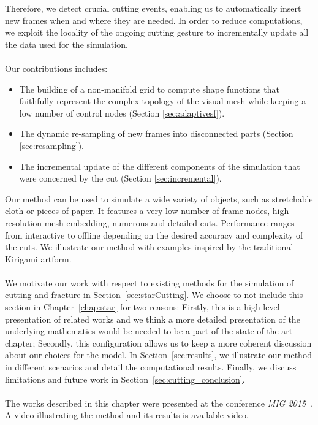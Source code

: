 Therefore, we detect crucial cutting events, enabling us to automatically insert new frames when and where they are needed.
In order to reduce computations, we exploit the locality of the ongoing cutting gesture to incrementally update all the data used for the simulation.
\\ \\
Our contributions includes:
\begin{itemize}
\item The building of a non-manifold grid to compute shape functions that faithfully represent the complex topology of the visual mesh while keeping a low number of control nodes (Section \ref{sec:adaptivesf}).
\item The dynamic re-sampling of new frames into disconnected parts (Section \ref{sec:resampling}).
\item The incremental update of the different components of the simulation that were concerned by the cut (Section \ref{sec:incremental}).
\end{itemize}

Our method can be used to simulate a wide variety of objects, such as stretchable cloth or pieces of paper. 
It features a very low number of frame nodes, high resolution mesh embedding, numerous and detailed cuts. 
Performance ranges from interactive to offline depending on the desired accuracy and complexity of the cuts.
We illustrate our method with examples inspired by the traditional Kirigami artform.
\\ \\
We motivate our work with respect to existing methods for the simulation of cutting and fracture in Section~\ref{sec:starCutting}.
We choose to not include this section in Chapter~\ref{chap:star} for two reasons:
Firstly, this is a high level presentation of related works and we think a more detailed presentation of the underlying mathematics would be needed to be a part of the state of the art chapter;
Secondly, this configuration allows us to keep a more coherent discussion about our choices for the model.
In Section~\ref{sec:results}, we illustrate our method in different scenarios and detail the computational results. 
Finally, we discuss limitations and future work in Section~\ref{sec:cutting_conclusion}. 
\\ \\
The works described in this chapter were presented at the conference \emph{MIG 2015}~\cite{Manteaux2015}.
A video illustrating the method and its results is available \href{https://hal.inria.fr/hal-01206780/file/Manteaux_MIG2015_IDCTS.mp4}{video}.
